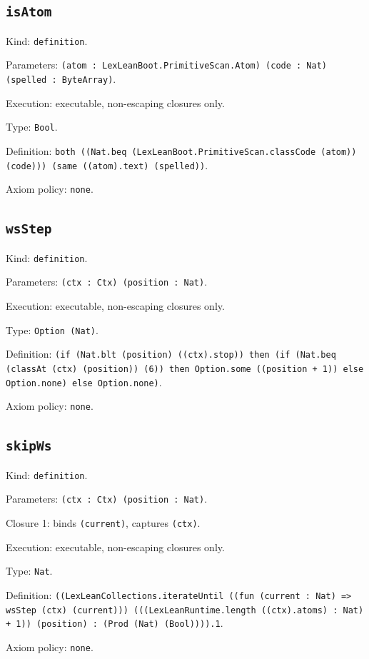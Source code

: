 \documentclass[11pt]{article}
\begin{document}
\subsection*{\texttt{isAtom}}
\noindent Kind: \texttt{definition}.\par
\noindent Parameters: \texttt{(atom : LexLeanBoot.PrimitiveScan.Atom) (code : Nat) (spelled : ByteArray)}.\par
\noindent Execution: executable, non-escaping closures only.\par
\noindent Type: \texttt{Bool}.\par
\noindent Definition: \texttt{both ((Nat.beq (LexLeanBoot.PrimitiveScan.classCode (atom)) (code))) (same ((atom).text) (spelled))}.\par
\noindent Axiom policy: \texttt{none}.\par
\subsection*{\texttt{wsStep}}
\noindent Kind: \texttt{definition}.\par
\noindent Parameters: \texttt{(ctx : Ctx) (position : Nat)}.\par
\noindent Execution: executable, non-escaping closures only.\par
\noindent Type: \texttt{Option (Nat)}.\par
\noindent Definition: \texttt{(if (Nat.blt (position) ((ctx).stop)) then (if (Nat.beq (classAt (ctx) (position)) (6)) then Option.some ((position + 1)) else Option.none) else Option.none)}.\par
\noindent Axiom policy: \texttt{none}.\par
\subsection*{\texttt{skipWs}}
\noindent Kind: \texttt{definition}.\par
\noindent Parameters: \texttt{(ctx : Ctx) (position : Nat)}.\par
\noindent Closure 1: binds \texttt{(current)}, captures \texttt{(ctx)}.\par
\noindent Execution: executable, non-escaping closures only.\par
\noindent Type: \texttt{Nat}.\par
\noindent Definition: \texttt{((LexLeanCollections.iterateUntil ((fun (current : Nat) => wsStep (ctx) (current))) (((LexLeanRuntime.length ((ctx).atoms) : Nat) + 1)) (position) : (Prod (Nat) (Bool)))).1}.\par
\noindent Axiom policy: \texttt{none}.\par
\end{document}
